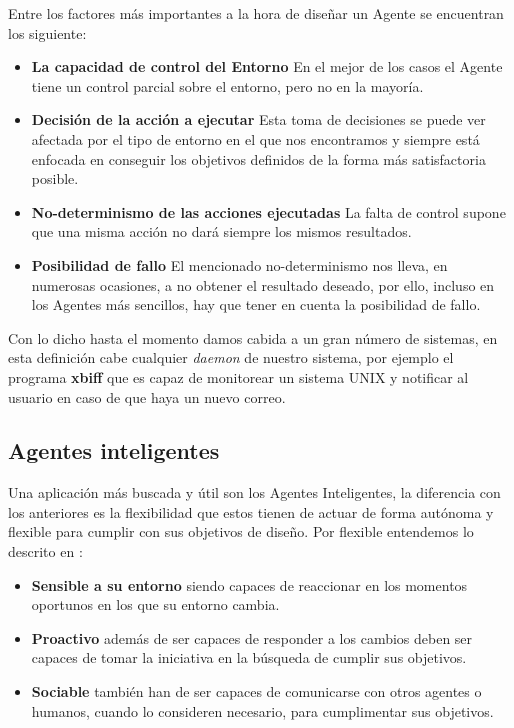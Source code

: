 Entre los factores más importantes a la hora de diseñar un Agente se encuentran los siguiente:

\begin{itemize}
	\item\textbf{La capacidad de control del Entorno} En el mejor de los casos el Agente tiene un control parcial sobre el entorno, pero no en la mayoría.
	\item\textbf{Decisión de la acción a ejecutar} Esta toma de decisiones se puede ver afectada por el tipo de entorno en el que nos encontramos y siempre está enfocada en conseguir los objetivos definidos de la forma más satisfactoria posible.
	\item\textbf{No-determinismo de las acciones ejecutadas} La falta de control supone que una misma acción no dará siempre los mismos resultados.
	\item\textbf{Posibilidad de fallo} El mencionado no-determinismo nos lleva, en numerosas ocasiones, a no obtener el resultado deseado, por ello, incluso en los Agentes más sencillos, hay que tener en cuenta la posibilidad de fallo.
\end{itemize}

Con lo dicho hasta el momento damos cabida a un gran número de sistemas, en esta definición cabe cualquier \textit{daemon} de nuestro sistema, por ejemplo el programa \textbf{xbiff} que es capaz de monitorear un sistema UNIX y notificar al usuario en caso de que haya un nuevo correo.

\subsection{Agentes inteligentes}

Una aplicación más buscada y útil son los Agentes Inteligentes, la diferencia con los anteriores es la flexibilidad que estos tienen de actuar de forma autónoma y flexible para cumplir con sus objetivos de diseño. Por flexible entendemos lo descrito en \cite{jennings1998agent}:

\begin{itemize}
	\item\textbf{Sensible a su entorno} siendo capaces de reaccionar en los momentos oportunos en los que su entorno cambia.
	\item\textbf{Proactivo} además de ser capaces de responder a los cambios deben ser capaces de tomar la iniciativa en la búsqueda de cumplir sus objetivos.
	\item\textbf{Sociable} también han de ser capaces de comunicarse con otros agentes o humanos, cuando lo consideren necesario, para cumplimentar sus objetivos.
\end{itemize}

